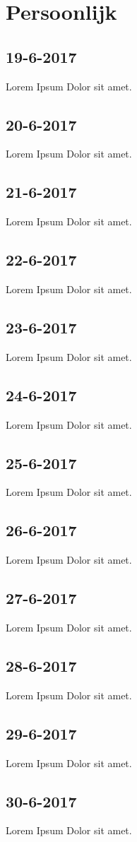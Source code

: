 \documentclass{uva-inf-article}
\begin{document}
\section{Persoonlijk}
\subsection{19-6-2017}
Lorem Ipsum Dolor sit amet.
\subsection{20-6-2017}
Lorem Ipsum Dolor sit amet.
\subsection{21-6-2017}
Lorem Ipsum Dolor sit amet.
\subsection{22-6-2017}
Lorem Ipsum Dolor sit amet.
\subsection{23-6-2017}
Lorem Ipsum Dolor sit amet.
\subsection{24-6-2017}
Lorem Ipsum Dolor sit amet.
\subsection{25-6-2017}
Lorem Ipsum Dolor sit amet.
\subsection{26-6-2017}
Lorem Ipsum Dolor sit amet.
\subsection{27-6-2017}
Lorem Ipsum Dolor sit amet.
\subsection{28-6-2017}
Lorem Ipsum Dolor sit amet.
\subsection{29-6-2017}
Lorem Ipsum Dolor sit amet.
\subsection{30-6-2017}
Lorem Ipsum Dolor sit amet.
\end{document}
